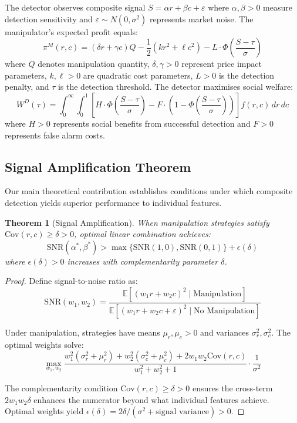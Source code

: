 \documentclass[12pt]{article}
\newtheorem{theorem}{Theorem}
\begin{document}
The detector observes composite signal $S = \alpha r + \beta c + \varepsilon$ where $\alpha, \beta > 0$ measure detection sensitivity and $\varepsilon \sim N(0,\sigma^2)$ represents market noise. The manipulator's expected profit equals:
\begin{equation}
\pi^M(r,c) = (\delta r + \gamma c)Q - \frac{1}{2}(kr^2 + \ell c^2) - L \cdot \Phi\left(\frac{S - \tau}{\sigma}\right)
\end{equation}
where $Q$ denotes manipulation quantity, $\delta, \gamma > 0$ represent price impact parameters, $k, \ell > 0$ are quadratic cost parameters, $L > 0$ is the detection penalty, and $\tau$ is the detection threshold. The detector maximises social welfare:
\begin{equation}
W^D(\tau) = \int_0^{\infty} \int_0^1 \left[H \cdot \Phi\left(\frac{S - \tau}{\sigma}\right) - F \cdot \left(1 - \Phi\left(\frac{S - \tau}{\sigma}\right)\right)\right] f(r,c) \, dr \, dc
\end{equation}
where $H > 0$ represents social benefits from successful detection and $F > 0$ represents false alarm costs.

\subsection{Signal Amplification Theorem}

Our main theoretical contribution establishes conditions under which composite detection yields superior performance to individual features.

\begin{theorem}[Signal Amplification]
When manipulation strategies satisfy $\text{Cov}(r,c) \geq \delta > 0$, optimal linear combination achieves:
\begin{equation}
\text{SNR}(\alpha^*, \beta^*) > \max\{\text{SNR}(1,0), \text{SNR}(0,1)\} + \epsilon(\delta)
\end{equation}
where $\epsilon(\delta) > 0$ increases with complementarity parameter $\delta$.
\end{theorem}

\begin{proof}
Define signal-to-noise ratio as:
\begin{equation}
\text{SNR}(w_1, w_2) = \frac{\mathbb{E}[(w_1 r + w_2 c)^2 \mid \text{Manipulation}]}{\mathbb{E}[(w_1 r + w_2 c + \varepsilon)^2 \mid \text{No Manipulation}]}
\end{equation}

Under manipulation, strategies have means $\mu_r, \mu_c > 0$ and variances $\sigma_r^2, \sigma_c^2$. The optimal weights solve:
\begin{equation}
\max_{w_1, w_2} \frac{w_1^2(\sigma_r^2 + \mu_r^2) + w_2^2(\sigma_c^2 + \mu_c^2) + 2w_1 w_2 \text{Cov}(r,c)}{w_1^2 + w_2^2 + 1} \cdot \frac{1}{\sigma^2}
\end{equation}

The complementarity condition $\text{Cov}(r,c) \geq \delta > 0$ ensures the cross-term $2w_1 w_2 \delta$ enhances the numerator beyond what individual features achieve. Optimal weights yield $\epsilon(\delta) = 2\delta/(\sigma^2 + \text{signal variance}) > 0$.
\end{proof}
\end{document}
